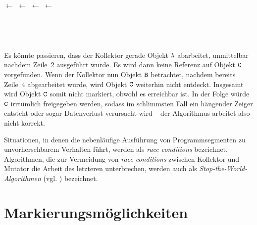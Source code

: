 \begin{center}
\begin{minipage}{0.3\textwidth}
	\centering
	\begin{algorithmic}[1]
		\State {} $\gets$ 
		\State {} $\gets$ \Null
		\State {} $\gets$ 
		\State {} $\gets$ \Null
	\end{algorithmic}
\end{minipage}~
\begin{minipage}{0.3\textwidth}
	\centering
	
\end{minipage}~
\begin{minipage}{0.3\textwidth}
	\centering
	
\end{minipage}
\end{center}

Es könnte passieren, dass der Kollektor gerade Objekt $\texttt{A}$ abarbeitet, unmittelbar nachdem Zeile~2 ausgeführt wurde.
Es wird dann keine Referenz auf Objekt $\texttt{C}$ vorgefunden.
Wenn der Kollektor nun Objekt $\texttt{B}$ betrachtet, nachdem bereits Zeile~4 abgearbeitet wurde, wird Objekt $\texttt{C}$ weiterhin nicht entdeckt.
Insgesamt wird Objekt $\texttt{C}$ somit nicht markiert, obwohl es erreichbar ist.
In der Folge würde $\texttt{C}$ irrtümlich freigegeben werden, sodass im schlimmsten Fall ein hängender Zeiger entsteht oder sogar Datenverlust verursacht wird -- der Algorithmus arbeitet also nicht korrekt.

Situationen, in denen die nebenläufige Ausführung von Programmsegmenten zu unvorhersehbarem Verhalten führt, werden als \textit{race conditions} bezeichnet.
Algorithmen, die zur Vermeidung von \textit{race conditions} zwischen Kollektor und Mutator die Arbeit des letzteren unterbrechen, werden auch als \textit{Stop-the-World-Algorithmen} (vgl. \cite[S. 17]{handbook}) bezeichnet.


\section{Markierungsmöglichkeiten}
\label{sec:marking-methods}



